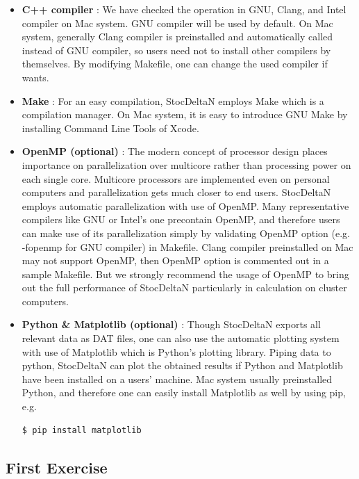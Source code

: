 \documentclass[aps, prd
, preprint
, nofootinbib 
, notitlepage
, superscriptaddress
, longbibliography
]{revtex4-1}
\begin{document}
\begin{itemize}
\item {\sffamily\bfseries C++ compiler} : We have checked the operation in GNU, Clang, and Intel compiler on Mac system. GNU compiler will be used by default.
On Mac system, generally Clang compiler is preinstalled and automatically called instead of GNU compiler, so users need not to install other compilers by themselves. 
By modifying Makefile, one can change the used compiler if wants.

\item {\sffamily\bfseries Make} : For an easy compilation, StocDeltaN employs Make which is a compilation manager. On Mac system, it is easy to introduce GNU Make
by installing Command Line Tools of Xcode.

\item {\sffamily\bfseries OpenMP (optional)} : The modern concept of processor design places importance on parallelization over multicore rather than processing power on each single core. 
Multicore processors are implemented even on personal computers and parallelization gets much closer to end users.
StocDeltaN employs automatic parallelization with use of OpenMP. Many representative compilers like GNU or Intel's one precontain OpenMP, and therefore
users can make use of its parallelization simply by validating OpenMP option (e.g. -fopenmp for GNU compiler) in Makefile.
Clang compiler preinstalled on Mac may not support OpenMP, then OpenMP option is commented out in a sample Makefile.
But we strongly recommend the usage of OpenMP to bring out the full performance of StocDeltaN particularly in calculation on cluster computers.

\item{\sffamily\bfseries Python \& Matplotlib (optional)} : Though StocDeltaN exports all relevant data as DAT files, one can also use the automatic plotting system
with use of Matplotlib which is Python's plotting library. Piping data to python, StocDeltaN can plot the obtained results if Python and Matplotlib have been installed
on a users' machine. Mac system usually preinstalled Python, and therefore one can easily install Matplotlib as well by using pip, e.g.
\begin{lstlisting}[language = bash, numbers = none]
$ pip install matplotlib
\end{lstlisting}

\end{itemize}


\subsection{First Exercise}
\end{document}
